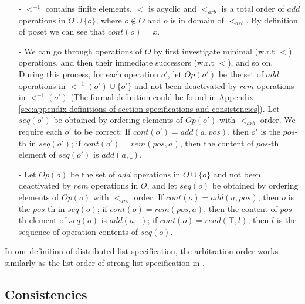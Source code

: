 \begin{itemize}
\setlength{\itemsep}{0.5pt}
\item[-] $<^{-1}$ contains finite elements, $<$ is acyclic and $<_{\textit{arb}}$ is a total order of $add$ operations in $O \cup \{ o \}$, where $o \notin O$ and $o$ is in domain of $<_{\textit{arb}}$. By definition of poset we can see that $cont(o)=x$.

\item[-] We can go through operations of $O$ by first investigate minimal (w.r.t $<$) operations, and then their immediate successors (w.r.t $<$), and so on. During this process, for each operation $o'$, let $Op(o')$ be the set of $add$ operations in $<^{-1}(o') \cup \{ o' \}$ and not been deactivated by $rem$ operations in $<^{-1}(o')$ (The formal definition could be found in Appendix \ref{sec:appendix definitions of section specifications and consistencies}). Let $seq(o')$ be obtained by ordering elements of $Op(o')$ with $<_{\textit{arb}}$ order. We require each $o'$ to be correct: If $cont(o')=add(a,pos)$, then $o'$ is the $pos$-th in $seq(o')$; if $cont(o')=rem(pos,a)$, then the content of $pos$-th element of $seq(o')$ is $add(a,\_)$.

\item[-] {\color {red}Let $Op(o)$ be the set of $add$ operations in $O \cup \{ o \}$ and not been deactivated by $rem$ operations in $O$, and let $seq(o)$ be obtained by ordering elements of $Op(o)$ with $<_{\textit{arb}}$ order.} If $cont(o)=add(a,pos)$, then $o$ is the $pos$-th in $seq(o)$; if $cont(o)=rem(pos,a)$, then the content of $pos$-th element of $seq(o)$ is $add(a,\_)$; if $cont(o)=read(\top,l)$, then $l$ is the sequence of operation contents of $seq(o)$.
\end{itemize}


In our definition of distributed list specification, the arbitration order works similarly as the list order of strong list specification in \cite{Attiya:2016}.





\subsection{Consistencies}
\label{subsec:consistencies}

